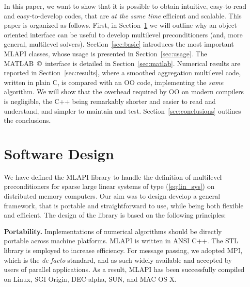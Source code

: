 \documentclass{article}[11pt]
\newcommand{\MLAPI}  {{\sc MLAPI }}
\newcommand{\mlapi}  {{\sc MLAPI }}
\begin{document}
\smallskip

In this paper, we want to show that it is possible to obtain intuitive,
  easy-to-read and easy-to-develop codes, that are {\sl at the same time}
  efficient and scalable.  This paper is organized as follows. First, in
  Section~\ref{sec:design} we will outline why an object-oriented interface
  can be useful to develop multilevel preconditioners (and, more general,
                                                       multilevel solvers).
  Section~\ref{sec:basic} introduces the most important \MLAPI classes, whose
  usage is presented in Section~\ref{sec:usage}. The
  MATLAB~\copyright~interface is detailed in Section~\ref{sec:matlab}.
  Numerical results are reported in Section~\ref{sec:results}, where a
  smoothed aggregation multilevel code, written in plain C, is compared with
  an OO code, implementing the {\sl same} algorithm.  We will show that the
  overhead required by OO on modern compilers is negligible, the C++ being
  remarkably shorter and easier to read and understand, and simpler to
  maintain and test.  Section~\ref{sec:conclusions} outlines the conclusions.

\section{Software Design}
\label{sec:design}

We have defined the \MLAPI library to handle the definition of multilevel
preconditioners for sparse large linear systems of type (\ref{eq:lin_sys})
  on distributed memory computers.
Our aim was to design develop a general framework, that is portable and
straightforward to use, while being both flexible and efficient. 
The design of the library is based on the following principles:

\bigskip

\noindent
{\bf Portability.} Implementations of numerical algorithms should be
directly portable across machine platforms.
\MLAPI is written in ANSI C++. The STL library is
employed to increase efficiency. For message
passing, we adopted MPI, which is the {\em de-facto} standard, and as such
widely available and accepted by users of parallel applications. As a result,
  \mlapi has been successfully compiled on Linux, SGI Origin, DEC-alpha, SUN,
  and MAC OS X.

\bigskip
\end{document}
